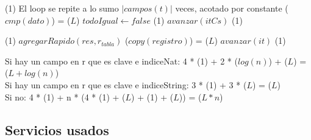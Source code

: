{                                             \comment \bigo(1)
                \State \icomment El loop se repite a lo sumo $|campos(t)|$ veces, acotado por constante
                  \comment \bigo($cmp(dato)$) = \bigo($L$)
                    \State $todoIgual \gets false$                  \comment \bigo(1)
                \EndIf
                \State $avanzar(itCs)$                              \comment \bigo(1)
            \EndWhile

                                                    \comment \bigo(1)
                \State $agregarRapido(res, r_{tabla})$              \comment \bigo($copy(registro)$) = \bigo($L$)
            \EndIf
            \State $avanzar(it)$                                    \comment \bigo(1)
        \EndWhile
    \EndIf
}{Si hay un campo en r que es clave e indiceNat: 4 * \bigo(1) + 2 * \bigo($log(n)$) + \bigo($L$) = \bigo($L + log(n)$) \\
    \hspace*{8.25em} Si hay un campo en r que es clave e indiceString: 3 * \bigo(1) + 3 * \bigo($L$) = \bigo($L$) \\
    \hspace*{8.25em} Si no: 4 * \bigo(1) + n * (4 * \bigo(1) + \bigo($L$) + \bigo(1) + \bigo($L$)) = \bigo($L * n$)
}


\subsection{Servicios usados}



